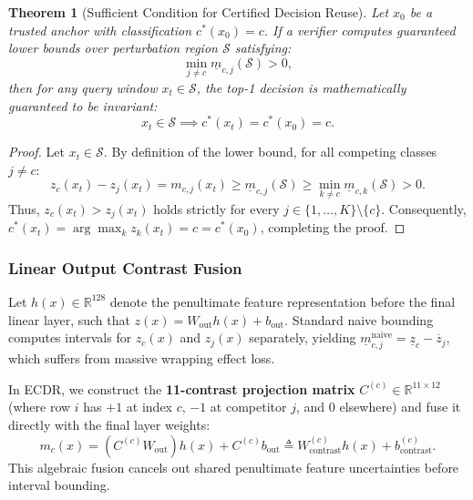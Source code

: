 \documentclass[journal,onecolumn,10pt]{IEEEtran}
\newcommand{\R}{\mathbb{R}}
\newtheorem{theorem}[definition]{Theorem}
\theoremstyle{remark}
\begin{document}
\begin{theorem}[Sufficient Condition for Certified Decision Reuse]\label{thm:soundness}
Let $x_0$ be a trusted anchor with classification $c^*(x_0) = c$. If a verifier computes guaranteed lower bounds over perturbation region $\mathcal{S}$ satisfying:
\begin{equation}\label{eq:margin_condition}
\min_{j \neq c} \underline{m}_{c,j}(\mathcal{S}) > 0,
\end{equation}
then for any query window $x_t \in \mathcal{S}$, the top-1 decision is mathematically guaranteed to be invariant:
\begin{equation}
x_t \in \mathcal{S} \implies c^*(x_t) = c^*(x_0) = c.
\end{equation}
\end{theorem}

\begin{proof}
Let $x_t \in \mathcal{S}$. By definition of the lower bound, for all competing classes $j \neq c$:
\begin{equation}
z_c(x_t) - z_j(x_t) = m_{c,j}(x_t) \ge \underline{m}_{c,j}(\mathcal{S}) \ge \min_{k \neq c} \underline{m}_{c,k}(\mathcal{S}) > 0.
\end{equation}
Thus, $z_c(x_t) > z_j(x_t)$ holds strictly for every $j \in \{1, \dots, K\} \setminus \{c\}$. Consequently, $c^*(x_t) = \arg\max_k z_k(x_t) = c = c^*(x_0)$, completing the proof.
\end{proof}

\subsubsection{Linear Output Contrast Fusion}
Let $h(x) \in \R^{128}$ denote the penultimate feature representation before the final linear layer, such that $z(x) = W_{\text{out}} h(x) + b_{\text{out}}$. Standard naive bounding computes intervals for $z_c(x)$ and $z_j(x)$ separately, yielding $\underline{m}_{c,j}^{\text{naive}} = \underline{z}_c - \overline{z}_j$, which suffers from massive wrapping effect loss. 

In ECDR, we construct the \textbf{11-contrast projection matrix} $C^{(c)} \in \R^{11 \times 12}$ (where row $i$ has $+1$ at index $c$, $-1$ at competitor $j$, and $0$ elsewhere) and fuse it directly with the final layer weights:
\begin{equation}
m_c(x) = \left(C^{(c)} W_{\text{out}}\right) h(x) + C^{(c)} b_{\text{out}} \triangleq W_{\text{contrast}}^{(c)} h(x) + b_{\text{contrast}}^{(c)}.
\end{equation}
This algebraic fusion cancels out shared penultimate feature uncertainties before interval bounding.
\end{document}

